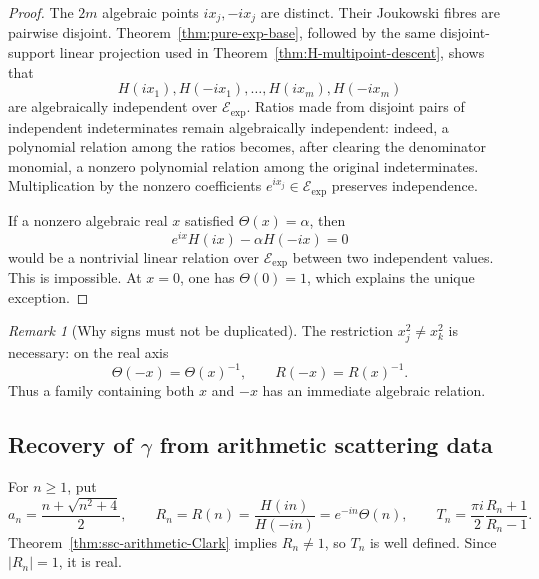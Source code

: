 \documentclass[11pt]{article}
\theoremstyle{definition}
\theoremstyle{remark}
\newtheorem{remark}[theorem]{Remark}
\newcommand{\Eexp}{\mathcal E_{\mathrm{exp}}}
\begin{document}
\begin{proof}
The \(2m\) algebraic points \(ix_j,-ix_j\) are distinct.  Their Joukowski
fibres are pairwise disjoint.  Theorem~\ref{thm:pure-exp-base}, followed by
the same disjoint-support linear projection used in
Theorem~\ref{thm:H-multipoint-descent}, shows that
\[
 H(ix_1),H(-ix_1),\ldots,H(ix_m),H(-ix_m)
\]
are algebraically independent over \(\Eexp\).  Ratios made from disjoint
pairs of independent indeterminates remain algebraically independent:
indeed, a polynomial relation among the ratios becomes, after clearing
the denominator monomial, a nonzero polynomial relation among the original
indeterminates.  Multiplication by the nonzero coefficients
\(e^{ix_j}\in\Eexp\) preserves independence.

If a nonzero algebraic real \(x\) satisfied \(\Theta(x)=\alpha\), then
\[
 e^{ix}H(ix)-\alpha H(-ix)=0
\]
would be a nontrivial linear relation over \(\Eexp\) between two
independent values.  This is impossible.  At \(x=0\), one has
\(\Theta(0)=1\), which explains the unique exception.
\end{proof}

\begin{remark}[Why signs must not be duplicated]
The restriction \(x_j^2\ne x_k^2\) is necessary: on the real axis
\[
 \Theta(-x)=\Theta(x)^{-1},\qquad R(-x)=R(x)^{-1}.
\]
Thus a family containing both \(x\) and \(-x\) has an immediate algebraic
relation.
\end{remark}

\subsection{Recovery of \texorpdfstring{$\gamma$}{gamma} from arithmetic
scattering data}

For \(n\geq1\), put
\begin{equation}\label{eq:ssc-an-Rn-Tn}
 a_n=\frac{n+\sqrt{n^2+4}}2,\qquad
 R_n=R(n)=\frac{H(in)}{H(-in)}=e^{-in}\Theta(n),\qquad
 T_n=\frac{\pi i}{2}\frac{R_n+1}{R_n-1}.
\end{equation}
Theorem~\ref{thm:ssc-arithmetic-Clark} implies \(R_n\ne1\), so \(T_n\)
is well defined.  Since \(|R_n|=1\), it is real.
\end{document}
